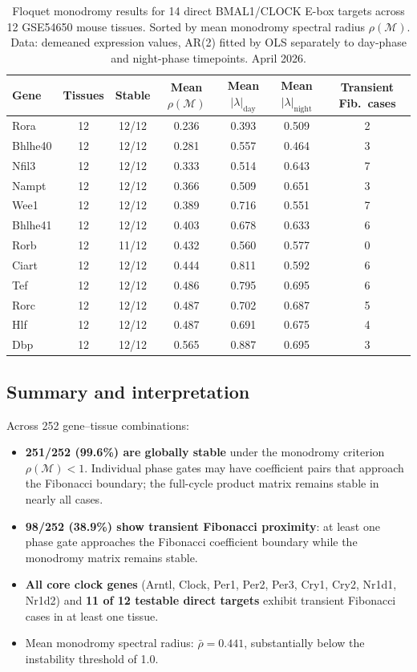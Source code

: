 \documentclass[11pt,letterpaper]{article}
\theoremstyle{definition}
\theoremstyle{remark}
\begin{document}
\begin{table}[H]
\centering
\caption{Floquet monodromy results for 14 direct BMAL1/CLOCK E-box targets across 12
GSE54650 mouse tissues. Sorted by mean monodromy spectral radius $\rho(\mathcal{M})$.
Data: demeaned expression values, AR(2) fitted by OLS separately to day-phase and
night-phase timepoints. April 2026.}
\label{tab:floquet}
\begin{tabular}{lcccccc}
\toprule
Gene & Tissues & Stable & Mean $\rho(\mathcal{M})$ & Mean $|\lambda|_{\text{day}}$ & Mean $|\lambda|_{\text{night}}$ & Transient Fib.\ cases \\
\midrule
Rora    & 12 & 12/12 & 0.236 & 0.393 & 0.509 & 2 \\
Bhlhe40 & 12 & 12/12 & 0.281 & 0.557 & 0.464 & 3 \\
Nfil3   & 12 & 12/12 & 0.333 & 0.514 & 0.643 & 7 \\
Nampt   & 12 & 12/12 & 0.366 & 0.509 & 0.651 & 3 \\
Wee1    & 12 & 12/12 & 0.389 & 0.716 & 0.551 & 7 \\
Bhlhe41 & 12 & 12/12 & 0.403 & 0.678 & 0.633 & 6 \\
Rorb    & 12 & 11/12 & 0.432 & 0.560 & 0.577 & 0 \\
Ciart   & 12 & 12/12 & 0.444 & 0.811 & 0.592 & 6 \\
Tef     & 12 & 12/12 & 0.486 & 0.795 & 0.695 & 6 \\
Rorc    & 12 & 12/12 & 0.487 & 0.702 & 0.687 & 5 \\
Hlf     & 12 & 12/12 & 0.487 & 0.691 & 0.675 & 4 \\
Dbp     & 12 & 12/12 & 0.565 & 0.887 & 0.695 & 3 \\
\bottomrule
\end{tabular}
\end{table}

\subsection{Summary and interpretation}

Across 252 gene--tissue combinations:
\begin{itemize}
\item \textbf{251/252 (99.6\%) are globally stable} under the monodromy criterion
$\rho(\mathcal{M}) < 1$. Individual phase gates may have coefficient pairs that approach
the Fibonacci boundary; the full-cycle product matrix remains stable in nearly all cases.
\item \textbf{98/252 (38.9\%) show transient Fibonacci proximity}: at least one phase gate
approaches the Fibonacci coefficient boundary while the monodromy matrix remains stable.
\item \textbf{All core clock genes} (Arntl, Clock, Per1, Per2, Per3, Cry1, Cry2, Nr1d1, Nr1d2)
and \textbf{11 of 12 testable direct targets} exhibit transient Fibonacci cases in at least
one tissue.
\item Mean monodromy spectral radius: $\bar{\rho} = 0.441$, substantially below the
instability threshold of 1.0.
\end{itemize}
\end{document}
